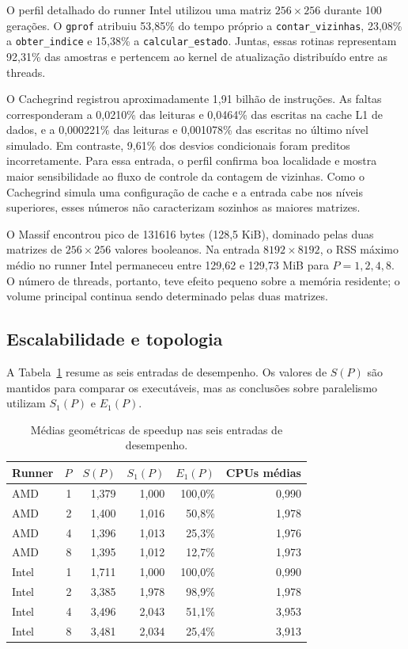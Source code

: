 \documentclass[12pt,a4paper]{article}
\begin{document}
O perfil detalhado do runner Intel utilizou uma matriz $256\times256$ durante
100 gerações. O \texttt{gprof} atribuiu 53,85\% do tempo próprio a
\texttt{contar\_vizinhas}, 23,08\% a \texttt{obter\_indice} e 15,38\% a
\texttt{calcular\_estado}. Juntas, essas rotinas representam 92,31\% das
amostras e pertencem ao kernel de atualização distribuído entre as threads.

O Cachegrind registrou aproximadamente 1,91 bilhão de instruções. As faltas
corresponderam a 0,0210\% das leituras e 0,0464\% das escritas na cache L1 de
dados, e a 0,000221\% das leituras e 0,001078\% das escritas no último nível
simulado. Em contraste, 9,61\% dos desvios condicionais foram preditos
incorretamente. Para essa entrada, o perfil confirma boa localidade e mostra
maior sensibilidade ao fluxo de controle da contagem de vizinhas. Como o
Cachegrind simula uma configuração de cache e a entrada cabe nos níveis
superiores, esses números não caracterizam sozinhos as maiores matrizes.

O Massif encontrou pico de 131616 bytes (128,5 KiB), dominado pelas duas
matrizes de $256\times256$ valores booleanos. Na entrada $8192\times8192$, o
RSS máximo médio no runner Intel permaneceu entre 129,62 e 129,73 MiB para
$P=1,2,4,8$. O número de threads, portanto, teve efeito pequeno sobre a memória
residente; o volume principal continua sendo determinado pelas duas matrizes.

\subsection{Escalabilidade e topologia}

A Tabela~\ref{tab:agregados} resume as seis entradas de desempenho. Os valores
de $S(P)$ são mantidos para comparar os executáveis, mas as conclusões sobre
paralelismo utilizam $S_1(P)$ e $E_1(P)$.

\begin{table}[htbp]
\centering
\small
\begin{tabular}{@{}lrrrrr@{}}
\toprule
\textbf{Runner} & $P$ & $S(P)$ & $S_1(P)$ & $E_1(P)$ & \textbf{CPUs médias}\\
\midrule
AMD & 1 & 1,379 & 1,000 & 100,0\% & 0,990\\
AMD & 2 & 1,400 & 1,016 & 50,8\% & 1,978\\
AMD & 4 & 1,396 & 1,013 & 25,3\% & 1,976\\
AMD & 8 & 1,395 & 1,012 & 12,7\% & 1,973\\
\midrule
Intel & 1 & 1,711 & 1,000 & 100,0\% & 0,990\\
Intel & 2 & 3,385 & 1,978 & 98,9\% & 1,978\\
Intel & 4 & 3,496 & 2,043 & 51,1\% & 3,953\\
Intel & 8 & 3,481 & 2,034 & 25,4\% & 3,913\\
\bottomrule
\end{tabular}
\caption{Médias geométricas de speedup nas seis entradas de desempenho.}
\label{tab:agregados}
\end{table}
\end{document}
